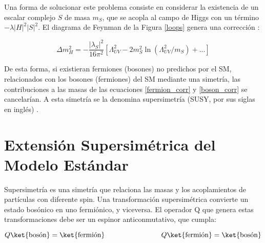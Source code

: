 Una forma de solucionar este problema consiste en considerar la existencia de un escalar complejo $S$ de masa $m_{S}$, que se acopla al campo de Higgs con un término $-\lambda |H|^{2}|S|^{2}$. El diagrama de Feynman de la Figura \ref{loops} genera una corrección :

\begin{equation}
\Delta m_{H}^{2}=-\frac{|\lambda_{S}|^{2}}{16\pi^{2}}\left[\Lambda_{UV}^{2}-2m_{S}^{2}\ln(\Lambda_{UV}^{2}/m_{S})+...\right]
\label{boson_corr}
\end{equation}


De esta forma, si existieran fermiones (bosones) no predichos por el SM, relacionados con los bosones (fermiones) del SM mediante una simetría, las contribuciones a las masas de las ecuaciones \ref{fermion_corr} y \ref{boson_corr} se cancelarían. A esta simetría se la denomina supersimetría (SUSY, por sus siglas en inglés) \cite{Martin:1997ns}.


\section{Extensión Supersimétrica del Modelo Estándar}

Supersimetría es una simetría que relaciona las masas y los acoplamientos de partículas con diferente spin. Una transformación supersimétrica convierte un estado bosónico en uno fermiónico, y viceversa. El operador Q que genera estas transformaciones debe ser un espinor anticonmutativo, que cumpla:

\begin{equation}
Q \ket{\text{bosón}} = \ket{\text{fermión}}
\qquad\qquad\qquad\qquad
Q \ket{\text{fermión}} = \ket{\text{bosón}}
\end{equation}

